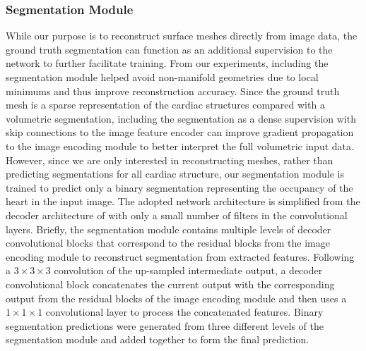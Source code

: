 \documentclass[times,review,preprint,authoryear]{elsarticle}
\begin{document}
\subsubsection{Segmentation Module}
While our purpose is to reconstruct surface meshes directly from image data, the ground truth segmentation can function as an additional supervision to the network to further facilitate training. From our experiments, including the segmentation module helped avoid non-manifold geometries due to local minimums and thus improve reconstruction accuracy. Since the ground truth mesh is a sparse representation of the cardiac structures compared with a volumetric segmentation, including the segmentation as a dense supervision with skip connections to the image feature encoder can improve gradient propagation to the image encoding module to better interpret the full volumetric input data. However, since we are only interested in reconstructing meshes, rather than predicting segmentations for all cardiac structure, our segmentation module is trained to predict only a binary segmentation representing the occupancy of the heart in the input image. The adopted network architecture is simplified from the decoder architecture of \cite{Isensee2017} with only a small number of filters in the convolutional layers. Briefly, the segmentation module contains multiple levels of decoder convolutional blocks that correspond to the residual blocks from the image encoding module to reconstruct segmentation from extracted features. Following a $3\times3\times3$ convolution of the up-sampled intermediate output, a decoder convolutional block concatenates the current output with the corresponding output from the residual blocks of the image encoding module and then uses a $1\times1\times1$ convolutional layer to process the concatenated features. Binary segmentation predictions were generated from three different levels of the segmentation module and added together to form the final prediction. 
\end{document}
